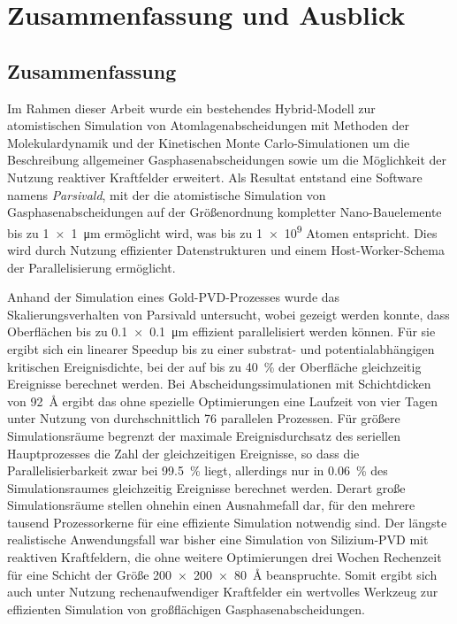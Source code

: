 \chapter{Zusammenfassung und Ausblick}
\label{summary}


\section{Zusammenfassung}

Im Rahmen dieser Arbeit wurde ein bestehendes Hybrid-Modell zur atomistischen Simulation von Atomlagenabscheidungen mit Methoden der Molekulardynamik und der Kinetischen Monte Carlo-Simulationen um die Beschreibung allgemeiner Gasphasenabscheidungen sowie um die Möglichkeit der Nutzung reaktiver Kraftfelder erweitert.
Als Resultat entstand eine Software namens \textit{Parsivald}, mit der die atomistische Simulation von Gasphasenabscheidungen auf der Größenordnung kompletter Nano-Bauelemente bis zu \SI{1x1}{\micro\meter} ermöglicht wird, was bis zu \num{1e9} Atomen entspricht.
Dies wird durch Nutzung effizienter Datenstrukturen und einem Host-Worker-Schema der Parallelisierung ermöglicht.


Anhand der Simulation eines Gold-PVD-Prozesses wurde das Skalierungsverhalten von Parsivald untersucht, wobei gezeigt werden konnte, dass Oberflächen bis zu \SI{0.1x0.1}{\micro\meter} effizient parallelisiert werden können.
Für sie ergibt sich ein linearer Speedup bis zu einer substrat- und potentialabhängigen kritischen Ereignisdichte, bei der auf bis zu \SI{40}{\percent} der Oberfläche gleichzeitig Ereignisse berechnet werden.
Bei Abscheidungssimulationen mit Schichtdicken von \SI{92}{\angstrom} ergibt das ohne spezielle Optimierungen eine Laufzeit von vier Tagen unter Nutzung von durchschnittlich \num{76} parallelen Prozessen.
Für größere Simulationsräume begrenzt der maximale Ereignisdurchsatz des seriellen Hauptprozesses die Zahl der gleichzeitigen Ereignisse, so dass die Parallelisierbarkeit zwar bei \SI{99.5}{\percent} liegt, allerdings nur in \SI{0.06}{\percent} des Simulationsraumes gleichzeitig Ereignisse berechnet werden.
Derart große Simulationsräume stellen ohnehin einen Ausnahmefall dar, für den mehrere tausend Prozessorkerne für eine effiziente Simulation notwendig sind.
Der längste realistische Anwendungsfall war bisher eine Simulation von Silizium-PVD mit reaktiven Kraftfeldern, die ohne weitere Optimierungen drei Wochen Rechenzeit für eine Schicht der Größe \SI{200x200x80}{\angstrom} beanspruchte.
Somit ergibt sich auch unter Nutzung rechenaufwendiger Kraftfelder ein wertvolles Werkzeug zur effizienten Simulation von großflächigen Gasphasenabscheidungen.

